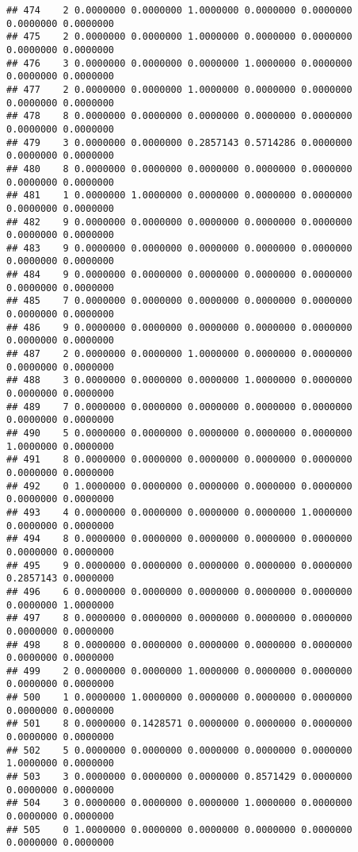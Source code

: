 \documentclass[
]{article}
\begin{document}
\begin{verbatim}
## 474    2 0.0000000 0.0000000 1.0000000 0.0000000 0.0000000 0.0000000 0.0000000
## 475    2 0.0000000 0.0000000 1.0000000 0.0000000 0.0000000 0.0000000 0.0000000
## 476    3 0.0000000 0.0000000 0.0000000 1.0000000 0.0000000 0.0000000 0.0000000
## 477    2 0.0000000 0.0000000 1.0000000 0.0000000 0.0000000 0.0000000 0.0000000
## 478    8 0.0000000 0.0000000 0.0000000 0.0000000 0.0000000 0.0000000 0.0000000
## 479    3 0.0000000 0.0000000 0.2857143 0.5714286 0.0000000 0.0000000 0.0000000
## 480    8 0.0000000 0.0000000 0.0000000 0.0000000 0.0000000 0.0000000 0.0000000
## 481    1 0.0000000 1.0000000 0.0000000 0.0000000 0.0000000 0.0000000 0.0000000
## 482    9 0.0000000 0.0000000 0.0000000 0.0000000 0.0000000 0.0000000 0.0000000
## 483    9 0.0000000 0.0000000 0.0000000 0.0000000 0.0000000 0.0000000 0.0000000
## 484    9 0.0000000 0.0000000 0.0000000 0.0000000 0.0000000 0.0000000 0.0000000
## 485    7 0.0000000 0.0000000 0.0000000 0.0000000 0.0000000 0.0000000 0.0000000
## 486    9 0.0000000 0.0000000 0.0000000 0.0000000 0.0000000 0.0000000 0.0000000
## 487    2 0.0000000 0.0000000 1.0000000 0.0000000 0.0000000 0.0000000 0.0000000
## 488    3 0.0000000 0.0000000 0.0000000 1.0000000 0.0000000 0.0000000 0.0000000
## 489    7 0.0000000 0.0000000 0.0000000 0.0000000 0.0000000 0.0000000 0.0000000
## 490    5 0.0000000 0.0000000 0.0000000 0.0000000 0.0000000 1.0000000 0.0000000
## 491    8 0.0000000 0.0000000 0.0000000 0.0000000 0.0000000 0.0000000 0.0000000
## 492    0 1.0000000 0.0000000 0.0000000 0.0000000 0.0000000 0.0000000 0.0000000
## 493    4 0.0000000 0.0000000 0.0000000 0.0000000 1.0000000 0.0000000 0.0000000
## 494    8 0.0000000 0.0000000 0.0000000 0.0000000 0.0000000 0.0000000 0.0000000
## 495    9 0.0000000 0.0000000 0.0000000 0.0000000 0.0000000 0.2857143 0.0000000
## 496    6 0.0000000 0.0000000 0.0000000 0.0000000 0.0000000 0.0000000 1.0000000
## 497    8 0.0000000 0.0000000 0.0000000 0.0000000 0.0000000 0.0000000 0.0000000
## 498    8 0.0000000 0.0000000 0.0000000 0.0000000 0.0000000 0.0000000 0.0000000
## 499    2 0.0000000 0.0000000 1.0000000 0.0000000 0.0000000 0.0000000 0.0000000
## 500    1 0.0000000 1.0000000 0.0000000 0.0000000 0.0000000 0.0000000 0.0000000
## 501    8 0.0000000 0.1428571 0.0000000 0.0000000 0.0000000 0.0000000 0.0000000
## 502    5 0.0000000 0.0000000 0.0000000 0.0000000 0.0000000 1.0000000 0.0000000
## 503    3 0.0000000 0.0000000 0.0000000 0.8571429 0.0000000 0.0000000 0.0000000
## 504    3 0.0000000 0.0000000 0.0000000 1.0000000 0.0000000 0.0000000 0.0000000
## 505    0 1.0000000 0.0000000 0.0000000 0.0000000 0.0000000 0.0000000 0.0000000

\end{verbatim}
\end{document}
